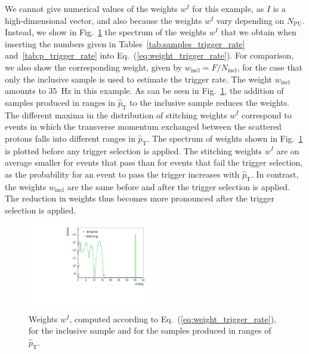 \documentclass[twocolumn,epjc3]{svjour3}
\newcommand{\pThat}{\ensuremath{\hat{p}_{\textrm{T}}}\xspace}
\newcommand{\incl}{\ensuremath{\textrm{incl}}\xspace}
\newcommand{\pileup}{\ensuremath{\textrm{PU}}\xspace}
\begin{document}
We cannot give numerical values of the weights $w^{I}$ for this example,
as $I$ is a high-dimensional vector, and also because the weights $w^{I}$ vary depending on $N_{\pileup}$.
Instead, we show in Fig.~\ref{fig:weight_trigger_rate} the spectrum of the weights $w^{I}$
that we obtain when inserting the numbers given in Tables~\ref{tab:samples_trigger_rate} and~\ref{tab:p_trigger_rate} into Eq.~(\ref{eq:weight_trigger_rate}).
For comparison, we also show the corresponding weight, given by $w_{\incl} = F/N_{\incl}$,
for the case that only the inclusive sample is used to estimate the trigger rate.
The weight $w_{\incl}$ amounts to $35$~Hz in this example.
As can be seen in Fig.~\ref{fig:weight_trigger_rate}, the addition of samples produced in ranges in $\pThat$ to the inclusive sample reduces the weights.
The different maxima in the distribution of stitching weights $w^{I}$ correspond to events 
in which the transverse momentum exchanged between the scattered protons falls into different ranges in $\pThat$.
The spectrum of weights shown in Fig.~\ref{fig:weight_trigger_rate} is plotted before any trigger selection is applied.
The stitching weights $w^{I}$ are on average smaller for events that pass than for events that fail the trigger selection,
as the probability for an event to pass the trigger increases with $\pThat$.
In contrast, the weights $w_{\incl}$ are the same before and after the trigger selection is applied.
The reduction in weights thus becomes more pronounced after the trigger selection is applied.

\begin{figure}
\includegraphics[width=0.48\textwidth]{plots/makeEvtWeightPlotsForPaper_evtWeight_log.pdf}
\caption{
  Weights $w^{I}$, computed according to Eq.~(\ref{eq:weight_trigger_rate}), 
  for the inclusive sample and for the samples produced in ranges of $\pThat$.
}
\label{fig:weight_trigger_rate}
\end{figure}
\end{document}
